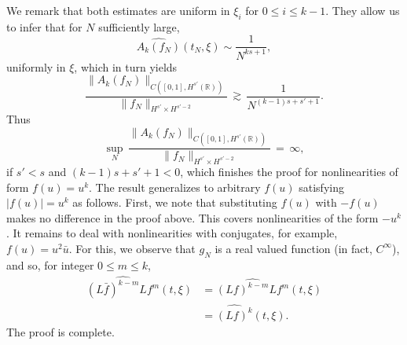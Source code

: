 \documentclass{amsart}
\newcommand{\wh}{\widehat}
\begin{document}
We remark that both estimates are uniform in $\xi_{i}$ for $0 \le i \le k-1$.
They allow us to infer that for $N$ sufficiently large,
\[
\widehat{A_{k}(f_N)}(t_N,\xi) \sim \frac{1}{N^{ks+1}},
\]
uniformly in $\xi$, which in turn yields
\[
\frac{\|A_{k}(f_N)\|_{C([0,1], H^{s'}(\mathbb{R}))}}{\|f_N\|_{H^{s'}\times H^{s'-2}}}\,\gtrsim\, \frac{1}{N^{(k-1)s+s'+1}}.\]
Thus
\[
\sup_N\,\frac{\|A_{k}(f_N)\|_{C([0,1], H^{s'}(\mathbb{R}))}}{\|f_N\|_{H^{s'}\times H^{s'-2}}}\,=\,\infty,\]
if $s'<s$ and $(k-1)s+s'+1<0$, which finishes the proof for nonlinearities of form $f(u) = u^{k}$. The result generalizes to arbitrary $f(u)$ satisfying $| f(u) | = u^{k}$ as follows. First, we note that substituting $f(u)$ with $-f(u)$ makes no difference in the proof above. This covers nonlinearities of the form $-u^{k}$. It remains to deal with nonlinearities with conjugates, for example, $f(u) = u^{2}\bar{u}$. For this, we observe that $g_{N}$ is a real valued function (in fact, $C^{\infty}$), and so, for integer $0 \le m \le k$,
\begin{equation*}
\begin{split}
  \wh{(L \bar{f})^{k-m}Lf^{m}}(t, \xi)
 & =
\wh{(L f)^{k-m}Lf^{m}}(t, \xi)
\\
& = \wh{(Lf)^{k}}(t, \xi).
  \end{split}
\end{equation*}
The proof is complete.
\end{document}
